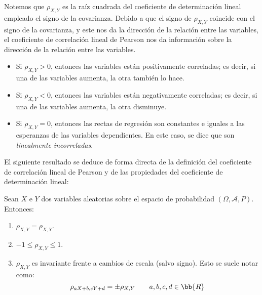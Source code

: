 Notemos que $\rho_{X,Y}$ es la raíz cuadrada del coeficiente de determinación lineal empleado el signo de la covarianza. Debido a que el signo de $\rho_{X,Y}$ coincide con el signo de la covarianza, y este nos da la dirección de la relación entre las variables, el coeficiente de correlación lineal de Pearson nos da información sobre la dirección de la relación entre las variables.
\begin{itemize}
    \item Si $\rho_{X,Y}>0$, entonces las variables están positivamente correladas; es decir, si una de las variables aumenta, la otra también lo hace.
    \item Si $\rho_{X,Y}<0$, entonces las variables están negativamente correladas; es decir, si una de las variables aumenta, la otra disminuye.
    \item Si $\rho_{X,Y}=0$, entonces las rectas de regresión son constantes e iguales a las esperanzas de las variables dependientes. En este caso, se dice que son \emph{linealmente incorreladas}.
\end{itemize}

El siguiente resultado se deduce de forma directa de la definición del coeficiente de correlación lineal de Pearson y de las propiedades del coeficiente de determinación lineal:
\begin{prop}
    Sean $X$ e $Y$ dos variables aleatorias sobre el espacio de probabilidad $(\Omega, \mathcal{A}, P)$. Entonces:
    \begin{enumerate}
        \item $\rho_{X,Y} = \rho_{X,Y}$.
        \item $-1\leq \rho_{X,Y} \leq 1$.
        \item $\rho_{X,Y}$ es invariante frente a cambios de escala (salvo signo). Esto se suele notar como:
        \begin{equation*}
            \rho_{aX+b,cY+d} = \pm \rho_{X,Y}\qquad a,b,c,d\in\bb{R}
        \end{equation*}
    \end{enumerate}
\end{prop}